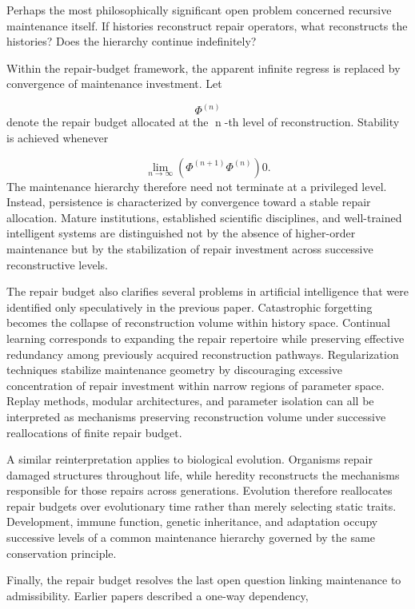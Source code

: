 \documentclass[12pt,oneside]{article}
\theoremstyle{plain}
\theoremstyle{definition}
\theoremstyle{remark}
\begin{document}
Perhaps the most philosophically significant open problem concerned recursive maintenance itself. If histories reconstruct repair operators, what reconstructs the histories? Does the hierarchy continue indefinitely?

Within the repair-budget framework, the apparent infinite regress is replaced by convergence of maintenance investment. Let

\[
\Phi^{(n)}
\]
denote the repair budget allocated at the n-th level of reconstruction. Stability is achieved whenever

\[
\lim_{n\rightarrow\infty}
\left(
\Phi^{(n+1)}
\Phi^{(n)}
\right)
0. 
\]
The maintenance hierarchy therefore need not terminate at a privileged level. Instead, persistence is characterized by convergence toward a stable repair allocation. Mature institutions, established scientific disciplines, and well-trained intelligent systems are distinguished not by the absence of higher-order maintenance but by the stabilization of repair investment across successive reconstructive levels.

The repair budget also clarifies several problems in artificial intelligence that were identified only speculatively in the previous paper. Catastrophic forgetting becomes the collapse of reconstruction volume within history space. Continual learning corresponds to expanding the repair repertoire while preserving effective redundancy among previously acquired reconstruction pathways. Regularization techniques stabilize maintenance geometry by discouraging excessive concentration of repair investment within narrow regions of parameter space. Replay methods, modular architectures, and parameter isolation can all be interpreted as mechanisms preserving reconstruction volume under successive reallocations of finite repair budget.

A similar reinterpretation applies to biological evolution. Organisms repair damaged structures throughout life, while heredity reconstructs the mechanisms responsible for those repairs across generations. Evolution therefore reallocates repair budgets over evolutionary time rather than merely selecting static traits. Development, immune function, genetic inheritance, and adaptation occupy successive levels of a common maintenance hierarchy governed by the same conservation principle.

Finally, the repair budget resolves the last open question linking maintenance to admissibility. Earlier papers described a one-way dependency,
\end{document}
